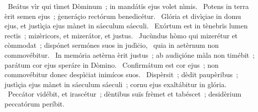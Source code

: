 ~Beátus vìr qui tìmet Dòminum~; in mandátïs ejus volet nìmis. 
~Potens in terra èrit semen ejus~; ġeneráçio rectórum benedicétur. 
~Glória et divìçiae in domu ejus, et justìçia ejus mànet in sáeculum sáeculi. 
~Exórtum est in tènebrïs lumen rectïs~; mizèricors, et mizerátor, et justus. 
~Jucùndus hòmo qui mizerétur et còmmodat~; dispónet sermónes suos in judìċio, 
~quia in aetèrnum non commovébitur. 
~In memória aetèrna èrit justus~; ab audiçióne màla non timébit~; parátum cor ejus speráre in Dòmino. 
~Confirmátum est cor ejus~; non commovébitur donec despìċiat inimícos suos. 
~Dispèrsit~; dèdit paupèribus~; justìçia ejus mànet in sáeculum sáeculi~; cornu ejus exaltábitur in glória. 
~Peccátor vidébit, et irascétur~; dèntibus suïs frèmet et tabéscet~; desidèrium peccatórum períbit. 
